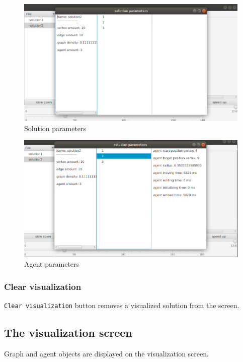 \documentclass[thesis=B,english]{FITthesis}[2019/12/23]
\begin{document}
\begin{figure}
	\includegraphics[scale=0.34]{solutionparameters.png}
	\caption[Start visualization]{Solution parameters}\label{fig:float13}
\end{figure}

\begin{figure}
	\includegraphics[scale=0.34]{agentparameters.png}
	\caption[Start visualization]{Agent parameters}\label{fig:float14}
\end{figure}



\subsubsection{Clear visualization}

\verb|Clear visualization| button removes a visualized solution from the screen.

\subsection{The visualization screen}

Graph and agent objects are displayed on the visualization screen. 
\end{document}
